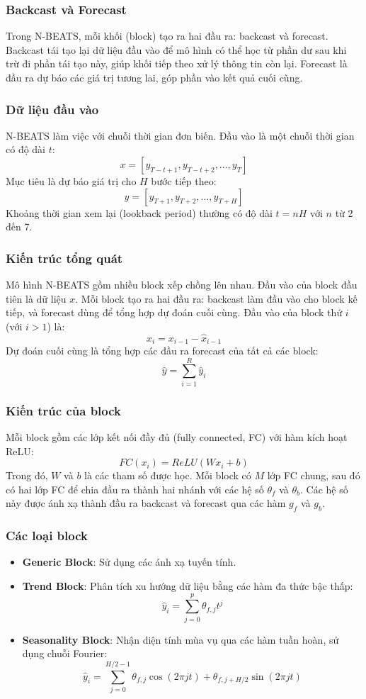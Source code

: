 \documentclass[conference]{IEEEtran}
\begin{document}
\subsubsection{Backcast và Forecast}
Trong N-BEATS, mỗi khối (block) tạo ra hai đầu ra: backcast và forecast. Backcast tái tạo lại dữ liệu đầu vào để mô hình có thể học từ phần dư sau khi trừ đi phần tái tạo này, giúp khối tiếp theo xử lý thông tin còn lại. Forecast là đầu ra dự báo các giá trị tương lai, góp phần vào kết quả cuối cùng.

\subsubsection{Dữ liệu đầu vào}
N-BEATS làm việc với chuỗi thời gian đơn biến. Đầu vào là một chuỗi thời gian có độ dài $t$:
\[
    x = [y_{T-t+1}, y_{T-t+2}, \ldots, y_T]
\]
Mục tiêu là dự báo giá trị cho $H$ bước tiếp theo:
\[
    y = [y_{T+1}, y_{T+2}, \ldots, y_{T+H}]
\]
Khoảng thời gian xem lại (lookback period) thường có độ dài $t = nH$ với $n$ từ 2 đến 7.

\subsubsection{Kiến trúc tổng quát}
Mô hình N-BEATS gồm nhiều block xếp chồng lên nhau. Đầu vào của block đầu tiên là dữ liệu $x$. Mỗi block tạo ra hai đầu ra: backcast làm đầu vào cho block kế tiếp, và forecast dùng để tổng hợp dự đoán cuối cùng. Đầu vào của block thứ $i$ (với $i > 1$) là:
\[
    x_i = x_{i-1} - \hat{x}_{i-1}
\]
Dự đoán cuối cùng là tổng hợp các đầu ra forecast của tất cả các block:
\[
    \hat{y} = \sum_{i=1}^{R} \hat{y}_i
\]

\subsubsection{Kiến trúc của block}
Mỗi block gồm các lớp kết nối đầy đủ (fully connected, FC) với hàm kích hoạt ReLU:
\[
    FC(x_i) = ReLU(Wx_i + b)
\]
Trong đó, $W$ và $b$ là các tham số được học. Mỗi block có $M$ lớp FC chung, sau đó có hai lớp FC để chia đầu ra thành hai nhánh với các hệ số $\theta_f$ và $\theta_b$. Các hệ số này được ánh xạ thành đầu ra backcast và forecast qua các hàm $g_f$ và $g_b$.

\subsubsection{Các loại block}
\begin{itemize}
    \item \textbf{Generic Block}: Sử dụng các ánh xạ tuyến tính.
    \item \textbf{Trend Block}: Phân tích xu hướng dữ liệu bằng các hàm đa thức bậc thấp:
          \[
              \hat{y}_i = \sum_{j=0}^{p} \theta_{f,j} t^j
          \]
    \item \textbf{Seasonality Block}: Nhận diện tính mùa vụ qua các hàm tuần hoàn, sử dụng chuỗi Fourier:
          \[
              \hat{y}_i = \sum_{j=0}^{H/2 - 1} \theta_{f,j} \cos(2\pi j t) + \theta_{f,j + H/2} \sin(2\pi j t)
          \]
\end{itemize}
\end{document}
